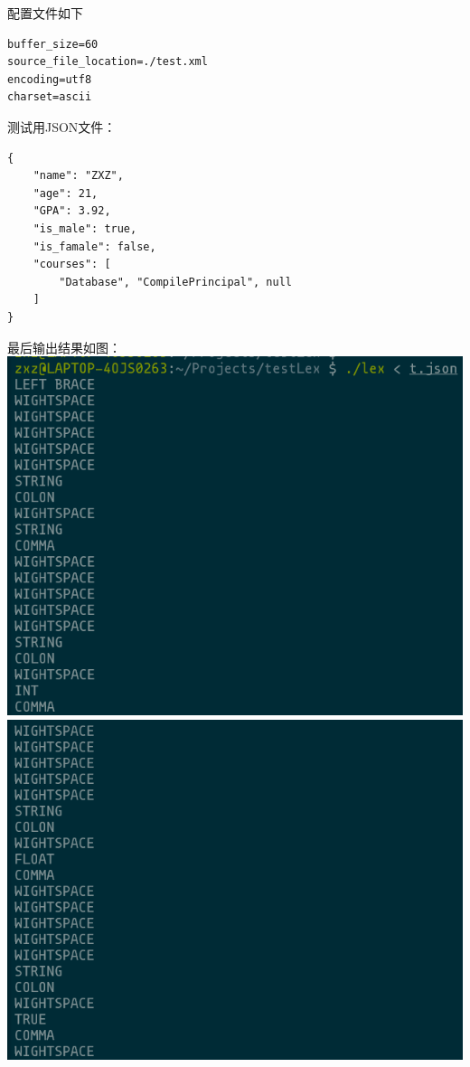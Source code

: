 配置文件如下
\begin{lstlisting}
buffer_size=60
source_file_location=./test.xml
encoding=utf8
charset=ascii
\end{lstlisting}
测试用JSON文件：
\lstset{language=json}
\begin{lstlisting}
{
    "name": "ZXZ",
    "age": 21,
    "GPA": 3.92,
    "is_male": true,
    "is_famale": false,
    "courses": [
        "Database", "CompilePrincipal", null
    ]
}
\end{lstlisting}
最后输出结果如图：\\
\includegraphics[scale=0.8]{1.png}\\
\includegraphics[scale=0.8]{2.png}\\
